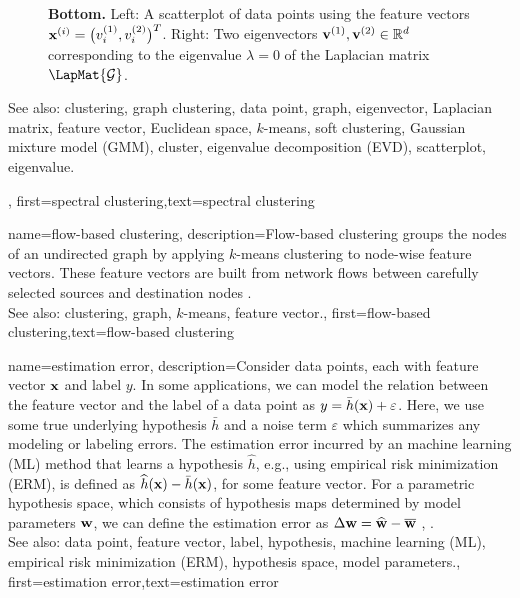 {{\begin{figure}[H]
\begin{center}
{					{\bf Bottom.} Left: A scatterplot of data points using the feature vectors 
					${\bf x}^{(i)} = \big( v^{(1)}_{i},v^{(2)}_{i} \big)^{T}$. 
					Right: Two eigenvectors ${\bf v}^{(1)},{\bf v}^{(2)} \in \mathbb{R}^{d}$ 
					corresponding to the eigenvalue $\lambda=0$ of the Laplacian matrix $\LapMat{\mathcal{G}}$. 
					} 
			\end{center}
		\end{figure}
		See also: clustering, graph clustering, data point, graph, eigenvector, Laplacian matrix, feature vector, Euclidean space, $k$-means, soft clustering, Gaussian mixture model (GMM), cluster, eigenvalue decomposition (EVD), scatterplot, eigenvalue.
	\newpage}, 
	first={spectral clustering},text={spectral clustering} 
}

{name={flow-based clustering},
	description={Flow-based clustering groups the nodes 
		of an undirected graph by applying $k$-means clustering to node-wise 
		feature vectors. These feature vectors are built from network flows between 
		carefully selected sources and destination nodes \cite{FlowSpecClustering2021}. 
					\\ 
		See also: clustering, graph, $k$-means, feature vector.}, 
	first={flow-based clustering},text={flow-based clustering} 
}



{name={estimation error},
	description={Consider data points, each with feature vector ${\bf x}$ and label 
		$y$. In some applications, we can model the relation between the feature vector and the label
		of a data point as $y = \bar{h}({\bf x}) + \varepsilon$. Here, we 
		use some true underlying hypothesis $\bar{h}$ and a noise term $\varepsilon$ 
		which summarizes any modeling or labeling errors. The estimation error incurred by an machine learning (ML) 
		method that learns a hypothesis $\widehat{h}$, e.g., using empirical risk minimization (ERM), is defined as 
		$\widehat{h}({\bf x}) - \bar{h}({\bf x})$, for some feature vector. 
		For a parametric hypothesis space, which consists of hypothesis maps determined by 
		model parameters ${\bf w}$, we can define the estimation error as $\Delta {\bf w} = \widehat{{\bf w}} - \overline{{\bf w}}$ \cite{kay}, \cite{hastie01statisticallearning}.
					\\ 
		See also: data point, feature vector, label, hypothesis, machine learning (ML), empirical risk minimization (ERM), hypothesis space, model parameters.},
	first={estimation error},text={estimation error} 
}


